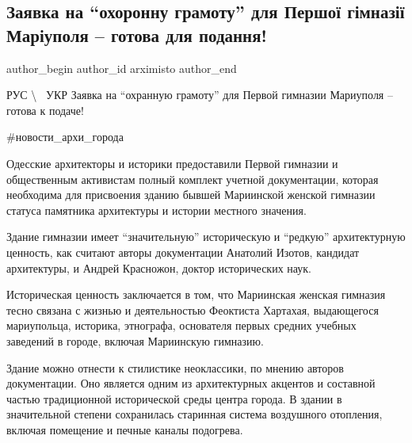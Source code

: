 
 
 
 
 

\subsection{Заявка на \enquote{охоронну грамоту} для Першої гімназії Маріуполя – готова для подання!}
\label{sec:09_09_2021.fb.arximisto.1.zajavka_ohoronna_gramota_gorova_mariinka}

\ifcmt
 author_begin
   author_id arximisto
 author_end
\fi

РУС \textbackslash~ УКР Заявка на \enquote{охранную грамоту} для Первой гимназии Мариуполя – готова к подаче!

\#новости\_архи\_города

Одесские архитекторы и историки предоставили Первой гимназии и общественным
активистам полный комплект учетной документации, которая необходима для
присвоения зданию бывшей Мариинской женской гимназии статуса памятника
архитектуры и истории местного значения. 

Здание гимназии имеет \enquote{значительную} историческую и \enquote{редкую}
архитектурную ценность, как считают авторы документации Анатолий Изотов,
кандидат архитектуры, и Андрей Красножон, доктор исторических наук.

Историческая ценность заключается в том, что Мариинская женская гимназия тесно
связана с жизнью и деятельностью Феоктиста Хартахая, выдающегося мариупольца,
историка, этнографа, основателя первых средних учебных заведений в городе,
включая Мариинскую гимназию.

Здание можно отнести к стилистике неоклассики, по мнению авторов документации.
Оно является одним из архитектурных акцентов и составной частью традиционной
исторической среды центра города. В здании в значительной степени сохранилась
старинная система воздушного отопления, включая помещение и печные каналы
подогрева.

